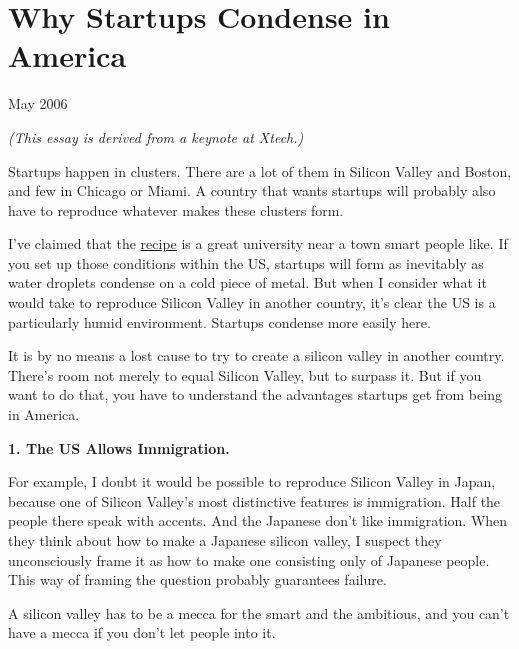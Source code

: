\chapter{Why Startups Condense in America}


            
              
                

May 2006

\emph{(This essay is derived from a keynote at Xtech.)}

Startups happen in clusters. There are a lot of
                  them in Silicon Valley and Boston, and few in Chicago or
                  Miami. A country that wants startups will probably also have
                  to reproduce whatever makes these clusters form.

I've
                  claimed that the \href{http://www.paulgraham.com/siliconvalley.html}{recipe} is a
                  great university near a town smart people like. If you set up
                  those conditions within the US, startups will form as
                  inevitably as water droplets condense on a cold piece of
                  metal. But when I consider what it would take to reproduce
                  Silicon Valley in another country, it's clear the US is a
                  particularly humid environment. Startups condense more easily
                  here.

It is by no means a lost cause to try to
                  create a silicon valley in another country. There's room not
                  merely to equal Silicon Valley, but to surpass it. But if you
                  want to do that, you have to understand the advantages
                  startups get from being in America.

\textbf{1. The US Allows Immigration.}

For example, I doubt it would be possible to
                  reproduce Silicon Valley in Japan, because one of Silicon
                  Valley's most distinctive features is immigration. Half the
                  people there speak with accents. And the Japanese don't like
                  immigration. When they think about how to make a Japanese
                  silicon valley, I suspect they unconsciously frame it as how
                  to make one consisting only of Japanese people. This way of
                  framing the question probably guarantees failure.

A
                  silicon valley has to be a mecca for the smart and the
                  ambitious, and you can't have a mecca if you don't let people
                  into it.

